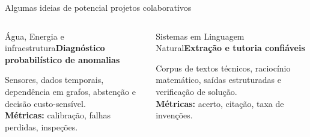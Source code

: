 \documentclass[aspectratio=169,11pt]{beamer}
\newcommand{\boxhead}[2]{\begin{block}{#1}#2\end{block}}
\begin{document}
\begin{frame}{Algumas ideias de potencial projetos colaborativos}
\vspace{.14cm}
\begin{columns}[T]
\boxhead{Água, Energia e infraestrutura}{\small\bfseries Diagnóstico probabilístico de anomalias\par\vspace{.10cm}Sensores, dados temporais, dependência em grafos, abstenção e decisão custo-sensível.\\\vspace{.15cm}\textbf{Métricas:} calibração, falhas perdidas, inspeções.}
\boxhead{Sistemas em Linguagem Natural}{\small\bfseries Extração e tutoria confiáveis\par\vspace{.10cm}Corpus de textos técnicos, raciocínio matemático, saídas estruturadas e verificação de solução.\\\vspace{.15cm}\textbf{Métricas:} acerto, citação, taxa de invenções.}
\end{columns}
\end{frame}
\end{document}
